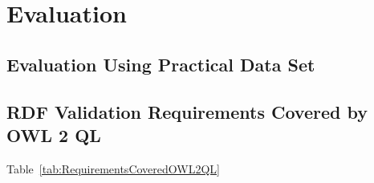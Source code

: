 \documentclass{llncs}
\begin{document}
\section{Evaluation}



\subsection{Evaluation Using Practical Data Set}



\subsection{RDF Validation Requirements Covered by OWL 2 QL}

Table~\ref{tab:RequirementsCoveredOWL2QL}
\end{document}

